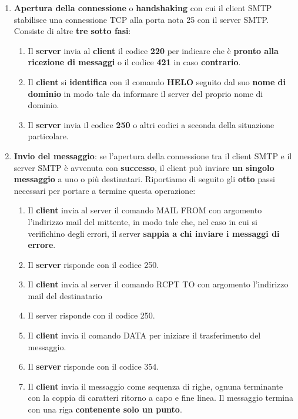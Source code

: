 \documentclass[11pt,a4paper]{article}
\theoremstyle{definition}
\begin{document}
\begin{enumerate}
	\item \textbf{Apertura della connessione} o \textbf{handshaking} con cui il client SMTP stabilisce una connessione TCP alla porta nota 25 con il server SMTP. Consiste di altre \textbf{tre sotto fasi}:
	      \begin{enumerate}[label*=\arabic*.]
		      \item Il \textbf{server} invia al \textbf{client} il codice \textbf{220} per indicare che è \textbf{pronto alla ricezione di messaggi} o il codice \textbf{421} in caso \textbf{contrario}.
		      \item Il \textbf{client} si \textbf{identifica} con il comando \textbf{HELO} seguito dal suo \textbf{nome di dominio} in modo tale da informare il server del proprio nome di dominio.
		      \item Il \textbf{server} invia il codice \textbf{250} o altri codici a seconda della situazione particolare.
	      \end{enumerate}
	\item \textbf{Invio del messaggio}: se l'apertura della connessione tra il client SMTP e il server SMTP è avvenuta con \textbf{successo}, il client può inviare \textbf{un singolo messaggio} a uno o più destinatari. Riportiamo di seguito gli \textbf{otto} passi necessari per portare a termine questa operazione:
	      \begin{enumerate}[label*=\arabic*.]
		      \item Il \textbf{client} invia al server il comando MAIL FROM con argomento l'indirizzo mail del mittente, in modo tale che, nel caso in cui si verifichino degli  errori, il server \textbf{sappia a chi inviare i messaggi di errore}.
		      \item Il \textbf{server} risponde con il codice 250.
		      \item Il \textbf{client} invia al server il comando RCPT TO con argomento l'indirizzo mail del destinatario
		      \item Il server risponde con il codice 250.
		      \item Il \textbf{client} invia il comando DATA per iniziare il trasferimento del messaggio.
		      \item Il \textbf{server} risponde con il codice 354.
		      \item Il \textbf{client} invia il messaggio come sequenza di righe, ognuna terminante con la coppia di caratteri ritorno a capo e fine linea. Il messaggio termina con una riga \textbf{contenente solo un punto}.

\end{enumerate}
\end{enumerate}
\end{document}
